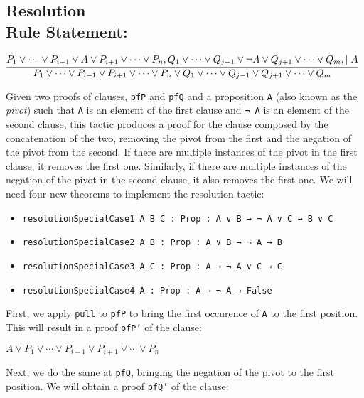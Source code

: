 \subsection*{Resolution\\\normalsize{Rule Statement:}}
\[
  \infer[]{P_{1} \vee \cdots \vee P_{i - 1} \vee P_{i + 1} \vee \cdots \vee P_{n} \vee Q_{1} \vee \cdots \vee Q_{j - 1} \vee Q_{j + 1} \vee \cdots \vee Q_{m}}{P_{1} \vee \cdots \vee P_{i - 1} \vee A \vee P_{i + 1} \vee \cdots \vee P_{n}, Q_{1} \vee \cdots \vee Q_{j - 1} \vee \neg A \vee Q_{j + 1} \vee \cdots \vee Q_{m}, \mid A}
\]

Given two proofs of clauses, \texttt{pfP} and \texttt{pfQ} and a proposition \texttt{A}
(also known as the \textit{pivot}) such that
\texttt{A} is an element of the first clause and \texttt{¬ A} is an element of the second clause, this tactic produces a proof for the clause composed by the concatenation
of the two, removing the pivot from the first and the negation of the pivot from the second. If there are multiple instances of the pivot in the first clause, it removes
the first one. Similarly, if there are multiple instances of the negation of the pivot
in the second clause, it also removes the first one. We will need four new theorems
to implement the resolution tactic:

\begin{itemize}
  \item \texttt{resolutionSpecialCase1 {A B C : Prop} : A ∨ B → ¬ A ∨ C → B ∨ C}
  \item \texttt{resolutionSpecialCase2 {A B : Prop} : A ∨ B → ¬ A → B}
  \item \texttt{resolutionSpecialCase3 {A C : Prop} : A → ¬ A ∨ C → C}
  \item \texttt{resolutionSpecialCase4 {A : Prop} : A → ¬ A → False}
\end{itemize}

First, we apply \texttt{pull} to \texttt{pfP} to bring the first occurence of \texttt{A} to the first position. This will result
in a proof \texttt{pfP'} of the clause:

\begin{center}
  $A \vee P_{1} \vee \cdots \vee P_{i - 1} \vee P_{i + 1} \vee \cdots \vee P_{n}$
\end{center}

Next, we do the same at \texttt{pfQ}, bringing the negation of the pivot to the first position. We will obtain a proof \texttt{pfQ'} of
the clause:

